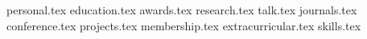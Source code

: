 \documentclass[margin,line]{res}
\newcommand*{\sectiondir}{sections/}
\begin{document}

\begin{resume}

{personal.tex}
{education.tex}
{awards.tex}
{research.tex}
{talk.tex}
{journals.tex}
{conference.tex}
{projects.tex}
{membership.tex}
{extracurricular.tex}
{skills.tex}

\end{resume}
\end{document}
